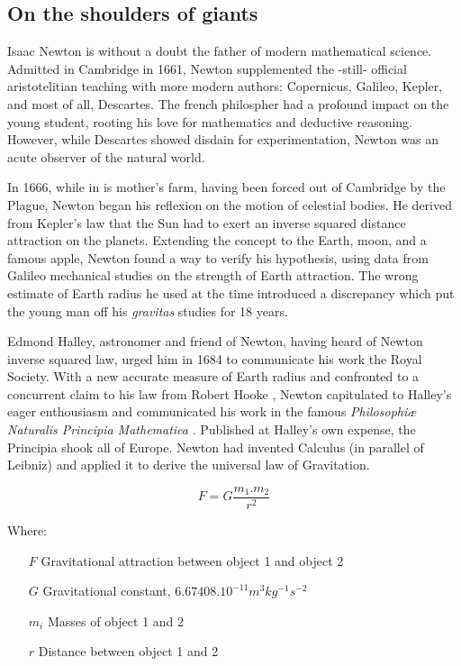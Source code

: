 \subsection{On the shoulders of giants}

Isaac Newton is without a doubt the father of modern mathematical science. Admitted in Cambridge in 1661, Newton supplemented the -still- official aristotelitian teaching with more modern authors: Copernicus, Galileo, Kepler, and most of all, Descartes. The french philospher had a profound impact on the young student, rooting his love for mathematics and deductive reasoning. However, while Descartes showed disdain for experimentation, Newton was an acute observer of the natural world. 

In 1666, while in is mother's farm, having been forced out of Cambridge by the Plague, Newton began his reflexion on the motion of celestial bodies. He derived from Kepler's law that the Sun had to exert an inverse squared distance attraction on the planets. Extending the concept to the Earth, moon, and a famous apple, Newton found a way to verify his hypothesis, using data from Galileo mechanical studies on the strength of Earth attraction. The wrong estimate of Earth radius he used at the time introduced a discrepancy which put the young man off his \textit{gravitas} studies for 18 years.

Edmond Halley, astronomer and friend of Newton, having heard of Newton inverse squared law, urged him in 1684 to communicate his work the Royal Society. With a new accurate measure of Earth radius and confronted to a concurrent claim to his law from Robert Hooke \citep{Kramer1982}, Newton capitulated to Halley's eager enthousiasm and communicated his work in the famous \textit{Philosophiæ Naturalis Principia Mathematica} \citep{Newton1687}. Published at Halley's own expense, the Principia shook all of Europe. Newton had invented Calculus (in parallel of Leibniz) and applied it to derive the universal law of Gravitation.

\begin{equation}
F = G \frac{m_1.m_2}{r^2}
\end{equation}


Where:
\begin{itemize}
 \setlength\itemsep{-0.5em}
  \item[$F$] Gravitational attraction between object 1 and object 2
\item[$G$] Gravitational constant, $6.67408.10^{-11} m^3 kg^{-1} s^{-2}$ \citep{Pavese2015}
\item[$m_i$] Masses of object 1 and 2
\item[$r$] Distance between object 1 and 2
\end{itemize}

